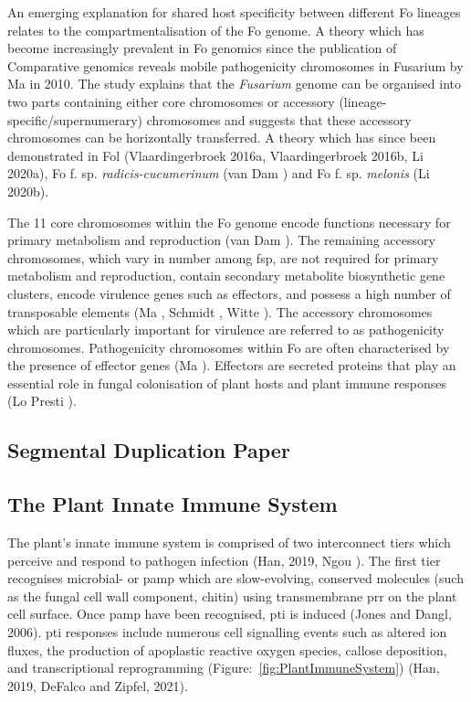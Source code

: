 An emerging explanation for shared host specificity between different \ac{Fo} lineages relates to the compartmentalisation of the \acl{Fo} genome. A theory which has become increasingly prevalent in \acl{Fo} genomics since the publication of Comparative genomics reveals mobile pathogenicity chromosomes in Fusarium by Ma \et in 2010. The study explains that the \textit{Fusarium} genome can be organised into two parts containing either core chromosomes or accessory (lineage-specific/supernumerary) chromosomes and suggests that these accessory chromosomes can be horizontally transferred. A theory which has since been demonstrated in Fol (Vlaardingerbroek \et 2016a, Vlaardingerbroek \et 2016b, Li \et 2020a), \acl{Fo} f. sp. \textit{radicis-cucumerinum} (van Dam ) and \acl{Fo} f. sp. \textit{melonis} (Li \et 2020b). 

The 11 core chromosomes within the \acl{Fo} genome encode functions necessary for primary metabolism and reproduction (van Dam ).  The remaining accessory chromosomes, which vary in number among \ac{fsp}, are not required for primary metabolism and reproduction, contain secondary metabolite biosynthetic gene clusters, encode virulence genes such as effectors, and possess a high number of transposable elements (Ma , Schmidt , Witte ). The accessory chromosomes which are particularly important for virulence are referred to as pathogenicity chromosomes.  Pathogenicity chromosomes within \acl{Fo} are often characterised by the presence of effector genes (Ma ). Effectors are secreted proteins that play an essential role in fungal colonisation of plant hosts and plant immune responses (Lo Presti ).  

\subsection{Segmental Duplication Paper}

\subsection{The Plant Innate Immune System}

The plant’s innate immune system is comprised of two interconnect tiers which perceive and respond to pathogen infection (Han, 2019, Ngou ). The first tier recognises microbial- or \ac{pamp} which are slow-evolving, conserved molecules (such as the fungal cell wall component, chitin) using transmembrane \ac{prr} on the plant cell surface. Once \ac{pamp} have been recognised, \ac{pti} is induced (Jones and Dangl, 2006). \ac{pti} responses include numerous cell signalling events such as altered ion fluxes, the production of apoplastic reactive oxygen species, callose deposition, and transcriptional reprogramming (Figure:~\ref{fig:PlantImmuneSystem}) (Han, 2019, DeFalco and Zipfel, 2021). 

